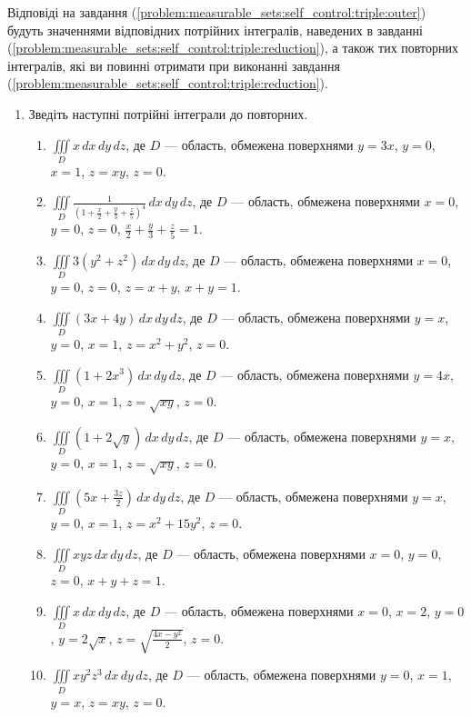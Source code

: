 Відповіді на завдання (\ref{problem:measurable_sets:self_control:triple:outer}) будуть значеннями відповідних потрійних інтегралів, наведених в завданні (\ref{problem:measurable_sets:self_control:triple:reduction}), а також тих повторних інтегралів, які ви повинні отримати при виконанні завдання (\ref{problem:measurable_sets:self_control:triple:reduction}).
\begin{enumerate}
\item\label{problem:measurable_sets:self_control:triple:reduction} Зведіть наступні потрійні інтеграли до повторних.
    \begin{enumerate}[label*=\arabic*.]
        \item $\iiint\limits_D x \,dx\,dy\,dz$, де $D$ --- область, обмежена поверхнями ${y = 3 x}$, ${y = 0}$, ${x = 1}$, ${z = x y}$, ${z = 0}$.
        \item $\iiint\limits_D \frac{1}{\left(1+\frac{x}{2}+\frac{y}{3}+\frac{z}{5}\right)^{4}} \,dx\,dy\,dz$, де $D$ --- область, обмежена поверхнями ${x = 0}$, ${y = 0}$, ${z = 0}$, ${\frac{x}{2}+\frac{y}{3}+\frac{z}{5} = 1}$.
        \item $\iiint\limits_D 3\left(y^{2}+z^{2}\right) \,dx\,dy\,dz$, де $D$ --- область, обмежена поверхнями ${x = 0}$, ${y = 0}$, ${z = 0}$, ${z = x + y}$, ${x + y = 1}$.
        \item $\iiint\limits_D \left(3x+4y\right) \,dx\,dy\,dz$, де $D$ --- область, обмежена поверхнями ${y = x}$, ${y = 0}$, ${x = 1}$, ${z = x^2 + y^2 }$, ${z = 0}$.
        \item $\iiint\limits_D \left(1+2x^{3}\right) \,dx\,dy\,dz$, де $D$ --- область, обмежена поверхнями ${y = 4 x}$, ${y = 0}$, ${x = 1}$, ${z = \sqrt{x y}}$, ${z = 0}$.
        \item $\iiint\limits_D \left(1+2\sqrt{y}\right) \,dx\,dy\,dz$, де $D$ --- область, обмежена поверхнями ${y = x}$, ${y = 0}$, ${x = 1}$, ${z = \sqrt{x y}}$, ${z = 0}$.
        \item $\iiint\limits_D \left(5x+\frac{3z}{2}\right) \,dx\,dy\,dz$, де $D$ --- область, обмежена поверхнями ${y = x}$, ${y = 0}$, ${x = 1}$, ${z = x^2 + 15y^2}$, ${z = 0}$.
        \item $\iiint\limits_D x y z \,dx\,dy\,dz$, де $D$ --- область, обмежена поверхнями  ${x = 0}$, ${y = 0}$, ${z = 0}$, ${x + y + z = 1}$.
        \item $\iiint\limits_D x \,dx\,dy\,dz$, де $D$ --- область, обмежена поверхнями ${x = 0}$, ${x = 2}$, ${y = 0}$, ${y = 2\sqrt{x}}$,  ${z = \sqrt{\frac{4 x - y^2}{2}}}$, ${z = 0}$.
        \item $\iiint\limits_D x y^{2} z^{3} \,dx\,dy\,dz$, де $D$ --- область, обмежена поверхнями  ${y = 0}$, ${x = 1}$, ${y = x}$, ${z = {x y}}$, ${z = 0}$.

\end{enumerate}
\end{enumerate}
